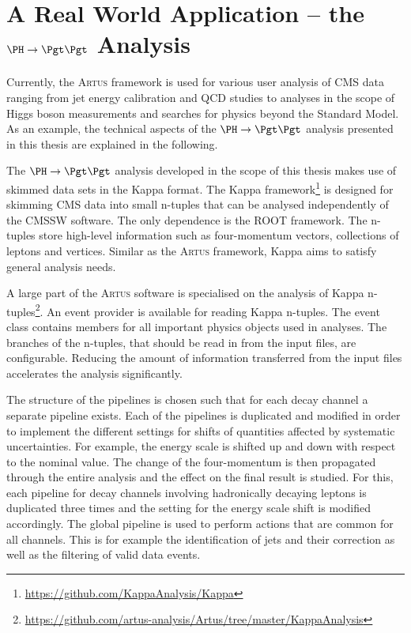 \documentclass[3p]{elsarticle}
\newcommand{\software}[1]{\textsc{#1}\xspace}
\newcommand{\artus}{\software{Artus}}
\begin{document}
\section{A Real World Application -- the $\PH\to\Pgt\Pgt$ Analysis \label{section_artus_example_htt}}

Currently, the \artus framework is used for various user analysis of CMS data ranging from jet energy calibration and QCD studies to analyses in the scope of Higgs boson measurements and searches for physics beyond the Standard Model. As an example, the technical aspects of the $\PH\to\Pgt\Pgt$ analysis presented in this thesis are explained in the following.

The $\PH\to\Pgt\Pgt$ analysis developed in the scope of this thesis makes use of skimmed data sets in the Kappa format. The Kappa framework\footnote{\url{https://github.com/KappaAnalysis/Kappa}} is designed for skimming CMS data into small n-tuples that can be analysed independently of the CMSSW software. The only dependence is the ROOT framework. The n-tuples store high-level information such as four-momentum vectors, collections of leptons and vertices. Similar as the \artus framework, Kappa aims to satisfy general analysis needs.

A large part of the \artus software is specialised on the analysis of Kappa n-tuples\footnote{\url{https://github.com/artus-analysis/Artus/tree/master/KappaAnalysis}}. An event provider is available for reading Kappa n-tuples. The event class contains members for all important physics objects used in analyses. The branches of the n-tuples, that should be read in from the input files, are configurable. Reducing the amount of information transferred from the input files accelerates the analysis significantly.

The structure of the pipelines is chosen such that for each decay channel a separate pipeline exists. Each of the pipelines is duplicated and modified in order to implement the different settings for shifts of quantities affected by systematic uncertainties. For example, the \Pgt energy scale is shifted up and down with respect to the nominal value. The change of the \Pgt four-momentum is then propagated through the entire analysis and the effect on the final result is studied. For this, each pipeline for decay channels involving hadronically decaying \Pgt leptons is duplicated three times and the setting for the \Pgt energy scale shift is modified accordingly. The global pipeline is used to perform actions that are common for all channels. This is for example the identification of jets and their correction as well as the filtering of valid data events.
\end{document}
